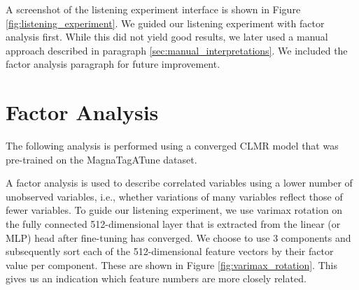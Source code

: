 A screenshot of the listening experiment interface is shown in Figure \ref{fig:listening_experiment}. We guided our listening experiment with factor analysis first. While this did not yield good results, we later used a manual approach described in paragraph \ref{sec:manual_interpretations}. We included the factor analysis paragraph for future improvement.

\section{Factor Analysis}
The following analysis is performed using a converged CLMR model that was pre-trained on the MagnaTagATune dataset.

A factor analysis is used to describe correlated variables using a lower number of unobserved variables, i.e., whether variations of many variables reflect those of fewer variables. To guide our listening experiment, we use varimax rotation on the fully connected 512-dimensional layer that is extracted from the linear (or MLP) head after fine-tuning has converged. We choose to use 3 components and subsequently sort each of the 512-dimensional feature vectors by their factor value per component. These are shown in Figure \ref{fig:varimax_rotation}. This gives us an indication which feature numbers are more closely related.

